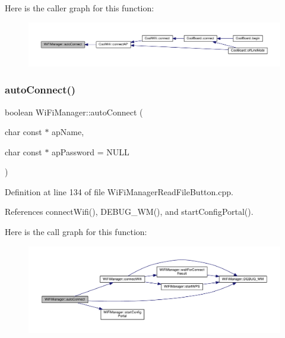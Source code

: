 Here is the caller graph for this function\+:
\nopagebreak
\begin{figure}[H]
\begin{center}
\leavevmode
\includegraphics[width=350pt]{d4/dc8/class_wi_fi_manager_ae3cdfa6b02edcfe63d7da4f696b62136_icgraph}
\end{center}
\end{figure}
\mbox{\label{class_wi_fi_manager_ab1d094034e5e3e36e2e1b3624edad469}} 
\subsubsection{\texorpdfstring{auto\+Connect()}{autoConnect()}\hspace{0.1cm}{\footnotesize\ttfamily [2/2]}}
{\footnotesize\ttfamily boolean Wi\+Fi\+Manager\+::auto\+Connect (\begin{DoxyParamCaption}\item[{char const $\ast$}]{ap\+Name,  }\item[{char const $\ast$}]{ap\+Password = {\ttfamily NULL} }\end{DoxyParamCaption})}



Definition at line 134 of file Wi\+Fi\+Manager\+Read\+File\+Button.\+cpp.



References connect\+Wifi(), D\+E\+B\+U\+G\+\_\+\+W\+M(), and start\+Config\+Portal().

Here is the call graph for this function\+:
\nopagebreak
\begin{figure}[H]
\begin{center}
\leavevmode
\includegraphics[width=350pt]{d4/dc8/class_wi_fi_manager_ab1d094034e5e3e36e2e1b3624edad469_cgraph}
\end{center}
\end{figure}
\mbox{\label{class_wi_fi_manager_ad781751307f7f623956126096a09a545}} 
